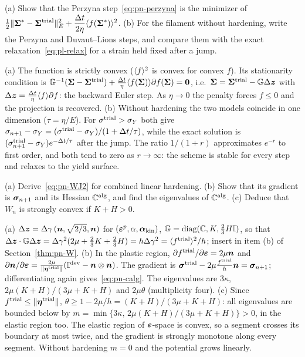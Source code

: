 \label{exo:pn-vp}
%
(a) Show that the Perzyna step~\eqref{eq:pn-perzyna} is the minimizer of
$\displaystyle \tfrac12\lVert \bm{\Sigma}^\ast-\bm{\Sigma}^{\mathrm{trial}}\rVert_E^2+\frac{\Delta t}{2\eta}\langle f(\bm{\Sigma}^\ast)\rangle^2$.
(b) For the filament without hardening, write the Perzyna and Duvaut--Lions
steps, and compare them with the exact relaxation~\eqref{eq:pl-relax} for a
strain held fixed after a jump.
\begin{solution}
(a) The function is strictly convex ($\langle f\rangle^2$ is convex for convex $f$).
Its stationarity condition is
$\mathbb{G}^{-1}(\bm{\Sigma}-\bm{\Sigma}^{\mathrm{trial}})+\frac{\Delta t}{\eta}\langle f(\bm{\Sigma})\rangle\partial f(\bm{\Sigma})=\bm{0}$,
i.e.\ $\bm{\Sigma}=\bm{\Sigma}^{\mathrm{trial}}-\mathbb{G}\Delta\bm{z}$ with
$\Delta\bm{z}=\frac{\Delta t}{\eta}\langle f\rangle\partial f$: the backward Euler step. As
$\eta\to0$ the penalty forces $f\le0$ and the projection is recovered.
(b) Without hardening the two models coincide in one dimension ($\tau=\eta/E$).
For $\sigma^{\mathrm{trial}}>\sigma_{Y}$ both give
$\sigma_{n+1}-\sigma_{Y}=(\sigma^{\mathrm{trial}}-\sigma_{Y})/(1+\Delta t/\tau)$, while the exact
solution is $(\sigma^{\mathrm{trial}}_{n+1}-\sigma_{Y})e^{-\Delta t/\tau}$ after the jump. The ratio
$1/(1+r)$ approximates $e^{-r}$ to first order, and both tend to zero as
$r\to\infty$: the scheme is stable for every step and relaxes to the yield
surface.
\end{solution}

\label{exo:pn-W}
%
(a) Derive~\eqref{eq:pn-WJ2} for combined linear hardening. (b) Show that its
gradient is $\bm{\sigma}_{n+1}$ and its Hessian $\mathbb{C}^{\mathrm{alg}}$, and find the eigenvalues of
$\mathbb{C}^{\mathrm{alg}}$. (c) Deduce that $W_n$ is strongly convex if $K+H>0$.
\begin{solution}
(a) $\Delta\bm{z}=\Delta\gamma\,(\bm{n},\sqrt{2/3},\bm{n})$ for $(\bm{\varepsilon}^{p},\alpha,\bm{\alpha}_{\mathrm{kin}})$,
$\mathbb{G}=\operatorname{diag}(\mathbb{C},K,\tfrac23H\mathbb{I})$, so that
$\Delta\bm{z}\cdot\mathbb{G}\Delta\bm{z}=\Delta\gamma^2(2\mu+\tfrac23K+\tfrac23H)=h\Delta\gamma^2=\langle f^{\mathrm{trial}}\rangle^2/h$;
insert in item (b) of Section~\ref{thm:pn-W}. (b) In the plastic region,
$\partial f^{\mathrm{trial}}/\partial\bm{\varepsilon}=2\mu\bm{n}$ and
$\partial\bm{n}/\partial\bm{\varepsilon}=\frac{2\mu}{\lVert \bm{\eta}^{\mathrm{trial}}\rVert}(\mathbb{I}^{\mathrm{dev}}-\bm{n}\otimes\bm{n})$.
The gradient is $\bm{\sigma}^{\mathrm{trial}}-2\mu\frac{f^{\mathrm{trial}}}{h}\bm{n}=\bm{\sigma}_{n+1}$; differentiating
again gives~\eqref{eq:pn-calg}. The eigenvalues are $3\kappa$,
$2\mu(K+H)/(3\mu+K+H)$ and $2\mu\theta$ (multiplicity four).
(c) Since $f^{\mathrm{trial}}\le\lVert \bm{\eta}^{\mathrm{trial}}\rVert$, $\theta\ge1-2\mu/h=(K+H)/(3\mu+K+H)$:
all eigenvalues are bounded below by
$m=\min\{3\kappa,\,2\mu(K+H)/(3\mu+K+H)\}>0$, in the elastic region too.
The elastic region of $\bm{\varepsilon}$-space is convex, so a segment crosses its
boundary at most twice, and the gradient is strongly monotone along every
segment. Without hardening $m=0$ and the potential grows linearly.
\end{solution}

